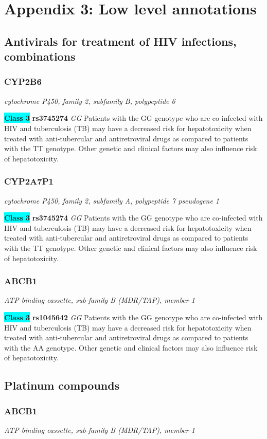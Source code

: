 \documentclass{report}
\begin{document}
\normalsize
\newpage

\section{Appendix 3: Low level annotations}\subsection{ Antivirals for treatment of HIV infections, combinations }\subsubsection{ CYP2B6 }
\textit{ cytochrome P450, family 2, subfamily B, polypeptide 6 }

\textbf{\colorbox{cyan} {Class 3}} \textbf{ rs3745274 } \textit{ GG }
Patients with the GG genotype who are co-infected with HIV and tuberculosis (TB) may have a decreased risk for hepatotoxicity when treated with anti-tubercular and antiretroviral drugs as compared to patients with the TT genotype. Other genetic and clinical factors may also influence risk of hepatotoxicity.\newline\subsubsection{ CYP2A7P1 }
\textit{ cytochrome P450, family 2, subfamily A, polypeptide 7 pseudogene 1 }

\textbf{\colorbox{cyan} {Class 3}} \textbf{ rs3745274 } \textit{ GG }
Patients with the GG genotype who are co-infected with HIV and tuberculosis (TB) may have a decreased risk for hepatotoxicity when treated with anti-tubercular and antiretroviral drugs as compared to patients with the TT genotype. Other genetic and clinical factors may also influence risk of hepatotoxicity.\newline\subsubsection{ ABCB1 }
\textit{ ATP-binding cassette, sub-family B (MDR/TAP), member 1 }

\textbf{\colorbox{cyan} {Class 3}} \textbf{ rs1045642 } \textit{ GG }
Patients with the GG genotype who are co-infected with HIV and tuberculosis (TB) may have a decreased risk for hepatotoxicity when treated with anti-tubercular and antiretroviral drugs as compared to patients with the AA genotype. Other genetic and clinical factors may also influence risk of hepatotoxicity.\newline\subsection{ Platinum compounds }\subsubsection{ ABCB1 }
\textit{ ATP-binding cassette, sub-family B (MDR/TAP), member 1 }
\end{document}
